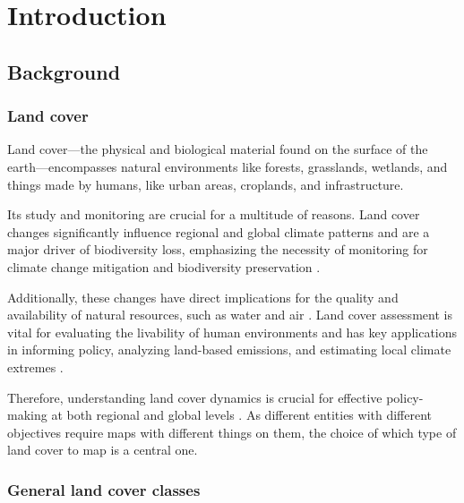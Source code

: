 \chapter[Introduction]{Introduction}
\label{cha:Chapter1}
\vspace*{\fill}


\newpage

\section{Background}

\subsection{Land cover}

    Land cover---the physical and biological material found on the surface of the earth---encompasses natural environments like forests, grasslands, wetlands, and things made by humans, like urban areas, croplands, and infrastructure. 
    
    Its study and monitoring are crucial for a multitude of reasons. Land cover changes significantly influence regional and global climate patterns and are a major driver of biodiversity loss, emphasizing the necessity of monitoring for climate change mitigation and biodiversity preservation \citep{pielke2002influence, houghton2012carbon, sala2000global, cbd2016indicators}. 
    
    Additionally, these changes have direct implications for the quality and availability of natural resources, such as water and air \citep{foley2005global}. Land cover assessment is vital for evaluating the livability of human environments \citep{krekel2016greener,levering2024landscape} and has key applications in informing policy, analyzing land-based emissions, and estimating local climate extremes \citep{duveiller2020, hong2021luemissions, sy2020,}. 

    Therefore, understanding land cover dynamics is crucial for effective policy-making at both regional and global levels \citep{liu2020assessing, trisurat2019land, shumba2020effectiveness}. As different entities with different objectives require maps with different things on them, the choice of which type of land cover to map is a central one. 

\subsection{General land cover classes}

